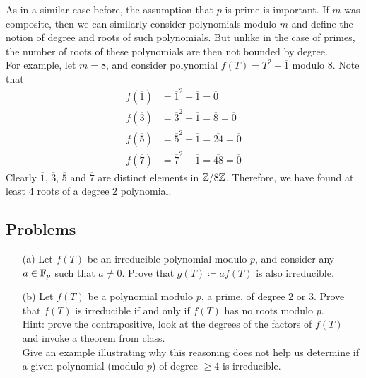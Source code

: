 \begin{remark}
As in a similar case before, the assumption that $p$ is prime is important. If $m$ was composite, then we can similarly consider polynomials modulo $m$ and define the notion of degree and roots of such polynomials. But unlike in the case of primes, the number of roots of these polynomials are then not bounded by degree.\\[0.5em]
For example, let $m = 8$, and consider polynomial $f(T) = T^2 - \overline{1}$ modulo $8$. Note that
\begin{align*}
f(\overline{1}) &= \overline{1}^2 - \overline{1} = \overline{0}\\[0.5em]
f(\overline{3}) &= \overline{3}^2 - \overline{1} = \overline{8} = \overline{0}\\[0.5em]
f(\overline{5}) &= \overline{5}^2 - \overline{1} = \overline{24} = \overline{0}\\[0.5em]
f(\overline{7}) &= \overline{7}^2 - \overline{1} = \overline{48} = \overline{0}
\end{align*}
Clearly $\overline{1},\,\overline{3},\,\overline{5}$ and $\overline{7}$ are distinct elements in $\mathbb Z/8\mathbb Z$. Therefore, we have found at least $4$ roots of a degree $2$ polynomial. 
\end{remark}

\vspace*{0.5in}

\subsection{Problems}
\vspace{0.1in}

\begin{problem}\label{Problem 13.1}\hfill
\begin{itemize}
\item[(a)] Let $f(T)$ be an irreducible polynomial modulo $p$, and consider any $a \in \mathbb F_p$ such that $a \neq \overline{0}$. Prove that $g(T) \coloneqq af(T)$ is also irreducible.
\item[(b)] Let $f(T)$ be a polynomial modulo $p$, a prime, of degree $2$ or $3$. Prove that $f(T)$ is irreducible if and only if $f(T)$ has no roots modulo $p$.\\[0.2em]
{\footnotesize Hint: prove the contrapositive, look at the degrees of the factors of $f(T)$ and invoke a theorem from class.}
\\[0.5em]
Give an example illustrating why this reasoning does not help us determine if a given polynomial (modulo $p$) of degree $\geq 4$ is irreducible.
\end{itemize}
\end{problem}

